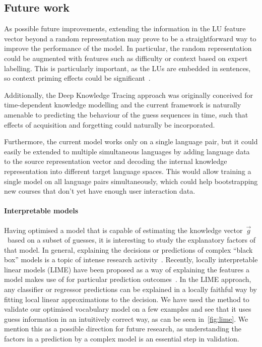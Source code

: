 \subsection{Future work}
As possible future improvements, extending the information in the LU feature vector beyond a random representation may prove to be a straightforward way to improve the performance of the model. In particular, the random representation could be augmented with features such as difficulty or context based on expert labelling. This is particularly important, as the LUs are embedded in sentences, so context priming effects could be significant~\cite{elgort2011deliberate}.

Additionally, the Deep Knowledge Tracing approach was originally conceived for time-dependent knowledge modelling and the current framework is naturally amenable to predicting the behaviour of the guess sequences in time, such that effects of acquisition and forgetting could naturally be incorporated.

Furthermore, the current model works only on a single language pair, but it could easily be extended to multiple simultaneous languages by adding language data to the source representation vector and decoding the internal knowledge representation into different target language spaces. This would allow training a single model on all language pairs simultaneously, which could help bootstrapping new courses that don't yet have enough user interaction data. 

\paragraph{Interpretable models}
Having optimised a model that is capable of estimating the knowledge vector~$\vec{g}$~based on a subset of guesses, it is interesting to study the explanatory factors of that model. In general, explaining the decisions or predictions of complex ``black box'' models is a topic of intense research activity~\cite{2017arXiv170808296S}. Recently, locally interpretable linear models (LIME) have been proposed as a way of explaining the features a model makes use of for particular prediction outcomes~\cite{ribeiro2016should}. In the LIME approach, any classifier or regressor predictions can be explained in a locally faithful way by fitting local linear approximations to the decision. We have used the method to validate our optimised vocabulary model on a few examples and see that it uses guess information in an intuitively correct way, as can be seen in~\cref{fig:lime}. We mention this as a possible direction for future research, as understanding the factors in a prediction by a complex model is an essential step in validation.

